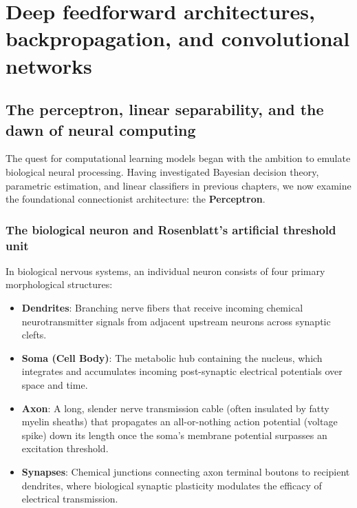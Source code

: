 \chapter{Deep feedforward architectures, backpropagation, and convolutional networks}
\label{sec:deep_networks_and_cnns}

\section{The perceptron, linear separability, and the dawn of neural computing}
\label{sec:perceptron_and_linear_separability}

The quest for computational learning models began with the ambition to emulate biological neural processing. Having investigated Bayesian decision theory, parametric estimation, and linear classifiers in previous chapters, we now examine the foundational connectionist architecture: the \textbf{Perceptron}.

\subsection{The biological neuron and Rosenblatt's artificial threshold unit}
\label{sec:biological_and_artificial_neuron}

In biological nervous systems, an individual neuron consists of four primary morphological structures:
\begin{itemize}[noitemsep]
  \item \textbf{Dendrites}: Branching nerve fibers that receive incoming chemical neurotransmitter signals from adjacent upstream neurons across synaptic clefts.
  \item \textbf{Soma (Cell Body)}: The metabolic hub containing the nucleus, which integrates and accumulates incoming post-synaptic electrical potentials over space and time.
  \item \textbf{Axon}: A long, slender nerve transmission cable (often insulated by fatty myelin sheaths) that propagates an all-or-nothing action potential (voltage spike) down its length once the soma's membrane potential surpasses an excitation threshold.
  \item \textbf{Synapses}: Chemical junctions connecting axon terminal boutons to recipient dendrites, where biological synaptic plasticity modulates the efficacy of electrical transmission.
\end{itemize}

